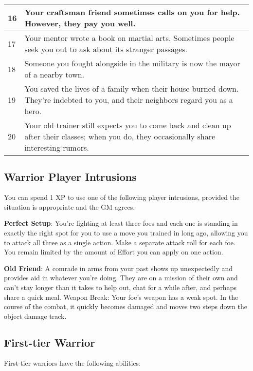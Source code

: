 \begin{table*}
\begin{tabularx}{\textwidth}{| p{} | p{} |}
16 & Your craftsman friend sometimes calls on you for help. However, they pay you well. \\ \hline
17 & Your mentor wrote a book on martial arts. Sometimes people seek you out to ask about its stranger passages. \\ \hline
18 & Someone you fought alongside in the military is now the mayor of a nearby town. \\ \hline
19 & You saved the lives of a family when their house burned down. They’re indebted to you, and their neighbors regard you as a hero. \\ \hline
20 & Your old trainer still expects you to come back and clean up after their classes; when you do, they occasionally share interesting rumors. \\ \hline

\end{tabularx}

\end{table*}

\subsection{Warrior Player Intrusions}

You can spend 1 XP to use one of the following player intrusions, provided the situation is appropriate and the GM agrees.

\textbf{Perfect Setup}: You’re fighting at least three foes and each one is standing in exactly the right spot for you to use a move you trained in long ago, allowing you to attack all three as a single action. Make a separate attack roll for each foe. You remain limited by the amount of Effort you can apply on one action.

\textbf{Old Friend}: A comrade in arms from your past shows up unexpectedly and provides aid in whatever you’re doing. They are on a mission of their own and can’t stay longer than it takes to help out, chat for a while after, and perhaps share a quick meal.
Weapon Break: Your foe’s weapon has a weak spot. In the course of the combat, it quickly becomes damaged and moves two steps down the object damage track.

\subsection{First-tier Warrior}

First-tier warriors have the following abilities:

